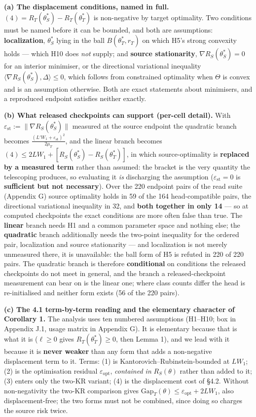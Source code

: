 \documentclass[pdflatex,sn-mathphys-ay]{sn-jnl}
\begin{document}
\textbf{(a) The displacement conditions, named in full.} $(4)=R_T(\theta^*_S)-R_T(\theta^*_T)$ is non-negative by target optimality. Two conditions must be named before it can be bounded, and both are assumptions: \textbf{localization}, $\theta^*_S$ lying in the ball $B(\theta^*_T,r_T)$ on which H5's strong convexity holds --- which H10 does \emph{not} supply; and \textbf{source stationarity}, $\nabla R_S(\theta^*_S)=0$ for an interior minimiser, or the directional variational inequality $\langle\nabla R_S(\theta^*_S),\Delta\rangle\le0$, which follows from constrained optimality when $\Theta$ is convex and is an assumption otherwise. Both are exact statements about minimisers, and a reproduced endpoint satisfies neither exactly.

\textbf{(b) What released checkpoints can support (per-cell detail).} With $\varepsilon_{\mathrm{st}}:=\|\nabla R_S(\theta^*_S)\|$ measured at the source endpoint the quadratic branch becomes $\frac{(L'W_1+\varepsilon_{\mathrm{st}})^2}{2\mu_T}$, and the linear branch becomes $(4)\le 2LW_1+[R_S(\theta^*_S)-R_S(\theta^*_T)]$, in which source-optimality is \textbf{replaced by a measured term} rather than assumed: the bracket is the very quantity the telescoping produces, so evaluating it \emph{is} discharging the assumption ($\varepsilon_{\mathrm{st}}=0$ is \textbf{sufficient but not necessary}). Over the 220 endpoint pairs of the read suite (Appendix G) source optimality holds in 59 of the 164 head-compatible pairs, the directional variational inequality in 32, and \textbf{both together in only 14} --- so at computed checkpoints the exact conditions are more often false than true. The \textbf{linear} branch needs H1 and a common parameter space and nothing else; the \textbf{quadratic} branch additionally needs the two-point inequality for the ordered pair, localization and source stationarity --- and localization is not merely unmeasured there, it is unavailable: the ball form of H5 is refuted in 220 of 220 pairs. The quadratic branch is therefore \textbf{conditional} on conditions the released checkpoints do not meet in general, and the branch a released-checkpoint measurement can bear on is the linear one; where class counts differ the head is re-initialised and neither form exists (56 of the 220 pairs).

\textbf{(c) The 4.1 term-by-term reading and the elementary character of Corollary 1.} The analysis uses ten numbered assumptions (H1--H10; box in Appendix J.1, usage matrix in Appendix G). It is elementary because that is what it is ($\ell\ge0$ gives $R_T(\theta^*_T)\ge0$, then Lemma 1), and we lead with it because it is \textbf{never weaker} than any form that adds a non-negative displacement term to it. Terms: (1) is Kantorovich--Rubinstein-bounded at $LW_1$; (2) is the optimisation residual $\varepsilon_{\mathrm{opt}}$, \emph{contained in} $R_S(\theta)$ rather than added to it; (3) enters only the two-KR variant; (4) is the displacement cost of \S{}4.2. Without non-negativity the two-KR comparison gives $\mathrm{Gap}_T(\theta)\le\varepsilon_{\mathrm{opt}}+2LW_1$, also displacement-free; the two forms must not be combined, since doing so charges the source risk twice.
\end{document}

